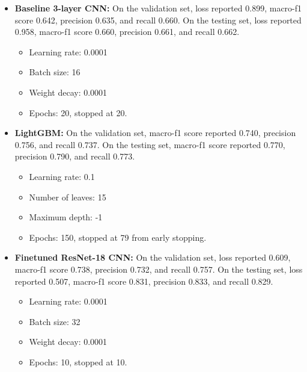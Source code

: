 \documentclass{article}
\begin{document}
\begin{itemize}
    \item \textbf{Baseline 3-layer CNN:} On the validation set, loss reported 0.899, macro-f1 score 0.642, precision 0.635, and recall 0.660. On the testing set, loss reported 0.958, macro-f1 score 0.660, precision 0.661, and recall 0.662.
    \begin{itemize}
        \item Learning rate: 0.0001
        \item Batch size: 16
        \item Weight decay: 0.0001
        \item Epochs: 20, stopped at 20.
    \end{itemize}
    \item \textbf{LightGBM:} On the validation set, macro-f1 score reported 0.740, precision 0.756, and recall 0.737. On the testing set, macro-f1 score reported 0.770, precision 0.790, and recall 0.773.
    \begin{itemize}
        \item Learning rate: 0.1
        \item Number of leaves: 15
        \item Maximum depth: -1
        \item Epochs: 150, stopped at 79 from early stopping.
    \end{itemize}
    \item \textbf{Finetuned ResNet-18 CNN:} On the validation set, loss reported 0.609, macro-f1 score 0.738, precision 0.732, and recall 0.757. On the testing set, loss reported 0.507, macro-f1 score 0.831, precision 0.833, and recall 0.829.
    \begin{itemize}
        \item Learning rate: 0.0001
        \item Batch size: 32
        \item Weight decay: 0.0001
        \item Epochs: 10, stopped at 10.
    \end{itemize}
\end{itemize}
\end{document}

